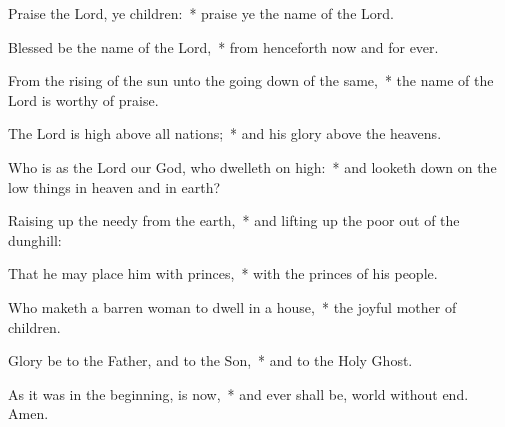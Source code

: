 \begin{enpars}
\item Praise the Lord, ye children:~* praise ye the name of the Lord.
\item Blessed be the name of the Lord,~* from henceforth now and for ever.
\item From the rising of the sun unto the going down of the same,~* the name of the Lord is worthy of praise.
\item The Lord is high above all nations;~* and his glory above the heavens.
\item Who is as the Lord our God, who dwelleth on high:~* and looketh down on the low things in heaven and in earth?
\item Raising up the needy from the earth,~* and lifting up the poor out of the dunghill:
\item That he may place him with princes,~* with the princes of his people.
\item Who maketh a barren woman to dwell in a house,~* the joyful mother of children.
\item Glory be to the Father, and to the Son,~* and to the Holy Ghost. 
\item  As it was in the beginning, is now,~* and ever shall be, world without end. Amen.
\end{enpars}